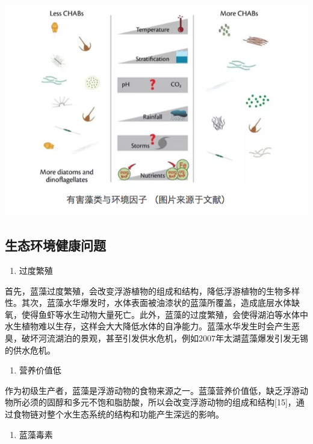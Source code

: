 \documentclass[
]{book}
\providecommand{\tightlist}{%
  \setlength{\itemsep}{0pt}\setlength{\parskip}{0pt}}
\begin{document}
\includegraphics[width=8.33in]{images/lanzao2}

\hypertarget{ux751fux6001ux73afux5883ux5065ux5eb7ux95eeux9898}{%
\subsection{生态环境健康问题}\label{ux751fux6001ux73afux5883ux5065ux5eb7ux95eeux9898}}

\begin{enumerate}
\def\labelenumi{\arabic{enumi}.}
\tightlist
\item
  过度繁殖
\end{enumerate}

首先，蓝藻过度繁殖，会改变浮游植物的组成和结构，降低浮游植物的生物多样性。其次，蓝藻水华爆发时，水体表面被油漆状的蓝藻所覆盖，造成底层水体缺氧，使得鱼虾等水生动物大量死亡。此外，蓝藻的过度繁殖，会使得湖泊等水体中水生植物难以生存，这样会大大降低水体的自净能力。蓝藻水华发生时会产生恶臭，破坏河流湖泊的景观，甚至引发供水危机，例如2007年太湖蓝藻爆发引发无锡的供水危机。

\begin{enumerate}
\def\labelenumi{\arabic{enumi}.}
\setcounter{enumi}{1}
\tightlist
\item
  营养价值低
\end{enumerate}

作为初级生产者，蓝藻是浮游动物的食物来源之一。蓝藻营养价值低，缺乏浮游动物所必须的固醇和多元不饱和脂肪酸，所以会改变浮游动物的组成和结构{[}15{]}，通过食物链对整个水生态系统的结构和功能产生深远的影响。

\begin{enumerate}
\def\labelenumi{\arabic{enumi}.}
\setcounter{enumi}{2}
\tightlist
\item
  蓝藻毒素
\end{enumerate}
\end{document}
